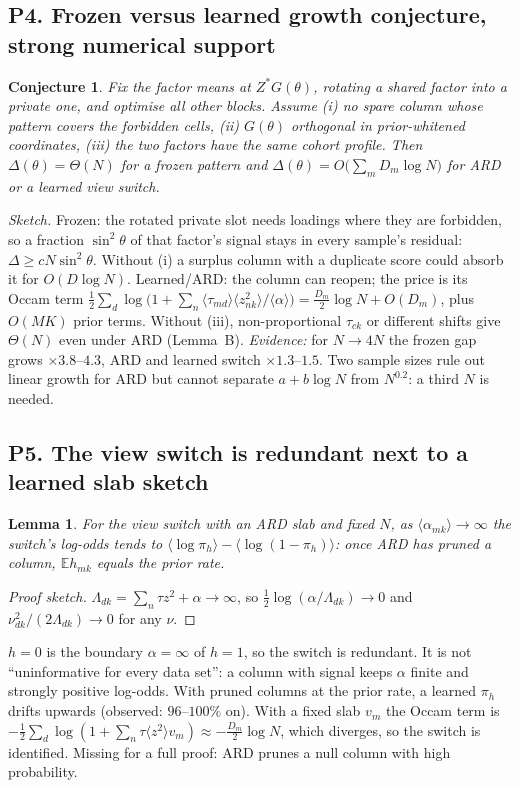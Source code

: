 \documentclass[11pt,a4paper]{article}
\newcommand{\E}{\mathbb{E}}
\newtheorem{lemma}{Lemma}
\newtheorem{conjecture}{Conjecture}
\theoremstyle{definition}
\theoremstyle{remark}
\begin{document}
\subsection*{P4. Frozen versus learned growth \hfill\textbf{conjecture}, strong numerical support}
\begin{conjecture}\label{conj:growth}
Fix the factor means at $Z^\ast G(\theta)$, rotating a shared factor into a private one, and optimise all other blocks.
Assume (i) no spare column whose pattern covers the forbidden cells, (ii) $G(\theta)$ orthogonal in prior-whitened
coordinates, (iii) the two factors have the same cohort profile. Then $\Delta(\theta)=\Theta(N)$ for a frozen pattern and
$\Delta(\theta)=O\big(\sum_mD_m\log N\big)$ for ARD or a learned view switch.
\end{conjecture}
\noindent\emph{Sketch.} Frozen: the rotated private slot needs loadings where they are forbidden, so a fraction
$\sin^2\theta$ of that factor's signal stays in every sample's residual: $\Delta\ge cN\sin^2\theta$. Without (i) a surplus
column with a duplicate score could absorb it for $O(D\log N)$. Learned/ARD: the column can reopen; the price is its Occam
term $\tfrac12\sum_d\log\big(1+\sum_n\langle\tau_{md}\rangle\langle z^2_{nk}\rangle/\langle\alpha\rangle\big)=\tfrac{D_m}2\log N+O(D_m)$, plus $O(MK)$ prior terms.
Without (iii), non-proportional $\tau_{ck}$ or different shifts give $\Theta(N)$ even under ARD (Lemma~B).
\emph{Evidence:} for $N\to4N$ the frozen gap grows $\times3.8$--$4.3$, ARD and learned switch $\times1.3$--$1.5$. Two sample sizes rule
out linear growth for ARD but cannot separate $a+b\log N$ from $N^{0.2}$: a third $N$ is needed.

\subsection*{P5. The view switch is redundant next to a learned slab \hfill\textbf{sketch}}
\begin{lemma}\label{lem:hid}
For the view switch with an ARD slab and fixed $N$, as $\langle\alpha_{mk}\rangle\to\infty$ the switch's log-odds tends to
$\langle\log\pi_h\rangle-\langle\log(1-\pi_h)\rangle$: once ARD has pruned a column, $\E h_{mk}$ equals the prior rate.
\end{lemma}
\begin{proof}[Proof sketch]
$\Lambda_{dk}=\sum_n\tau z^2+\alpha\to\infty$, so $\tfrac12\log(\alpha/\Lambda_{dk})\to0$ and $\nu^2_{dk}/(2\Lambda_{dk})\to0$ for any $\nu$. \qedhere
\end{proof}
\noindent $h=0$ is the boundary $\alpha=\infty$ of $h=1$, so the switch is redundant. It is not ``uninformative for every
data set'': a column with signal keeps $\alpha$ finite and strongly positive log-odds. With pruned columns at the prior
rate, a learned $\pi_h$ drifts upwards (observed: $96$--$100\%$ on). With a fixed slab $v_m$ the Occam term is
$-\tfrac12\sum_d\log(1+\sum_n\tau\langle z^2\rangle v_m)\approx-\tfrac{D_m}2\log N$, which diverges, so the switch is identified. Missing for a
full proof: ARD prunes a null column with high probability.
\end{document}
